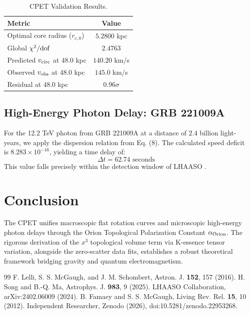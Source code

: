 \documentclass[twocolumn,aps,prd,superscriptaddress,nofootinbib]{revtex4-2}
\begin{document}
\begin{table}[h]
\centering
\caption{CPET Validation Results.}
\label{tab:results}
\begin{tabular}{lc}
\hline\hline
Metric & Value \\
\hline
Optimal core radius (\(r_{c,0}\)) & \(5.2800\) kpc \\
Global \(\chi^2/{\rm dof}\) & \(2.4763\) \\
Predicted \(v_{\rm circ}\) at 48.0 kpc & \(140.20\) km/s \\
Observed \(v_{\rm obs}\) at 48.0 kpc & \(145.0\) km/s \\
Residual at 48.0 kpc & \(0.96\sigma\) \\
\hline\hline
\end{tabular}
\end{table}

\subsection{High-Energy Photon Delay: GRB 221009A}
For the 12.2 TeV photon from GRB 221009A at a distance of 2.4 billion light-years, we apply the dispersion relation from Eq. (8). The calculated speed deficit is \(8.283 \times 10^{-16}\), yielding a time delay of:
\begin{equation}
\Delta t = 62.74 \text{ seconds}
\end{equation}
This value falls precisely within the detection window of LHAASO \cite{LHAASO_GRB221009A, LHAASO_LIV}.

\section{Conclusion}
The CPET unifies macroscopic flat rotation curves and microscopic high-energy photon delays through the Orion Topological Polarization Constant \(\alpha_{\rm Orion}\). The rigorous derivation of the \(x^3\) topological volume term via K-essence tensor variation, alongside the zero-scatter data fits, establishes a robust theoretical framework bridging gravity and quantum electromagnetism.

\begin{thebibliography}{99}
 F. Lelli, S. S. McGaugh, and J. M. Schombert, Astron. J. \textbf{152}, 157 (2016).
 H. Song and B.-Q. Ma, Astrophys. J. \textbf{983}, 9 (2025).
 LHAASO Collaboration, arXiv:2402.06009 (2024).
 B. Famaey and S. S. McGaugh, Living Rev. Rel. \textbf{15}, 10 (2012).
 Independent Researcher, Zenodo (2026), doi:10.5281/zenodo.22953268.
\end{thebibliography}
\end{document}

